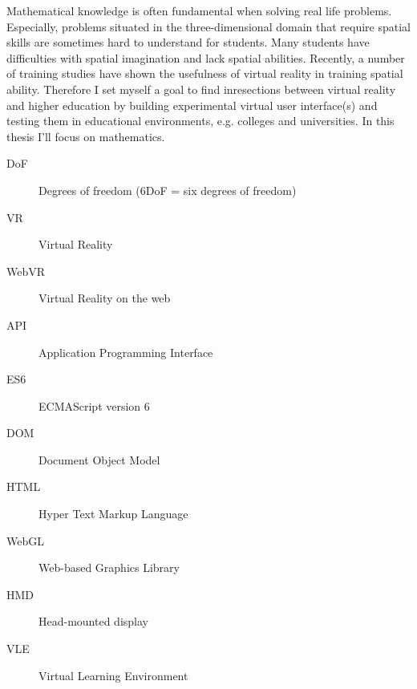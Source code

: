 \documentclass[]{tukethesis}
\begin{document}
\preface %
Mathematical knowledge is often fundamental when solving real life problems. Especially, problems situated in the three-dimensional domain that require spatial skills are sometimes hard to understand for students. Many students have difficulties with spatial imagination and lack spatial abilities. Recently, a number of training studies have shown the usefulness of virtual reality in training spatial ability. Therefore I set myself a goal to find inresections between virtual reality and higher education by building experimental virtual user interface(s) and testing them in educational environments, e.g. colleges and universities. In this thesis I'll focus on mathematics.
\endpreface

\thispagestyle{empty}
\tableofcontents
\newpage

\thispagestyle{empty}
\listoffigures
\newpage


\thispagestyle{empty}

\listofterms %

\begin{description}
\item[DoF] Degrees of freedom (6DoF = six degrees of freedom)
\item[VR] Virtual Reality
\item[WebVR] Virtual Reality on the web
\item[API] Application Programming Interface
\item[ES6] ECMAScript version 6
\item[DOM] Document Object Model
\item[HTML]Hyper Text Markup Language
\item[WebGL] Web-based Graphics Library
\item[HMD] Head-mounted display
\item[VLE] Virtual Learning Environment
\end{description}

\endlistofterms


\newpage
\lstlistoflistings


%

%

%
%
%

%

%

%

%

%

%

%

%
\end{document}
